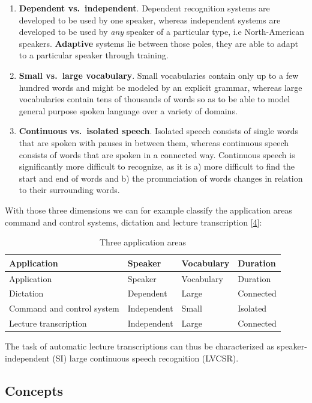 \documentclass[]{article}
\begin{document}
\begin{enumerate}
\def\labelenumi{(\arabic{enumi})}
\item
  \textbf{Dependent vs.~independent}. Dependent recognition systems are
  developed to be used by one speaker, whereas independent systems are
  developed to be used by \emph{any} speaker of a particular type, i.e
  North-American speakers. \textbf{Adaptive} systems lie between those
  poles, they are able to adapt to a particular speaker through
  training.
\item
  \textbf{Small vs.~large vocabulary}. Small vocabularies contain only
  up to a few hundred words and might be modeled by an explicit grammar,
  whereas large vocabularies contain tens of thousands of words so as to
  be able to model general purpose spoken language over a variety of
  domains.
\item
  \textbf{Continuous vs.~isolated speech}. Isolated speech consists of
  single words that are spoken with pauses in between them, whereas
  continuous speech consists of words that are spoken in a connected
  way. Continuous speech is significantly more difficult to recognize,
  as it is a) more difficult to find the start and end of words and b)
  the pronunciation of words changes in relation to their surrounding
  words.
\end{enumerate}

With those three dimensions we can for example classify the application
areas command and control systems, dictation and lecture transcription
{[}\hyperref[ref-marquard]{4}{]}:

\begin{longtable}[c]{@{}llll@{}}
\caption{Three application areas}\tabularnewline
\toprule
Application & Speaker & Vocabulary & Duration\tabularnewline
\midrule
\endfirsthead
\toprule
Application & Speaker & Vocabulary & Duration\tabularnewline
\midrule
\endhead
Dictation & Dependent & Large & Connected\tabularnewline
Command and control system & Independent & Small &
Isolated\tabularnewline
Lecture transcription & Independent & Large & Connected\tabularnewline
\bottomrule
\end{longtable}

The task of automatic lecture transcriptions can thus be characterized
as speaker-independent (SI) large continuous speech recognition (LVCSR).

\subsection{Concepts}\label{concepts}
\end{document}

